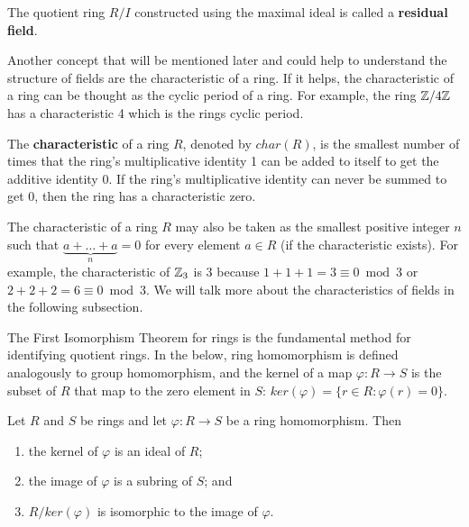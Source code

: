 \documentclass[../main.tex]{subfiles}
\begin{document}
The quotient ring $R/I$ constructed using the maximal ideal is called a \textbf{residual field}.


Another concept that will be mentioned later and could help to understand the structure of fields are the characteristic of a ring. 
If it helps, the characteristic of a ring can be thought as the cyclic period of a ring. For example, the ring $\mathbb{Z}/4\mathbb{Z}$ has a characteristic 4 which is the rings cyclic period. 

\begin{definition}
The \textbf{characteristic} of a ring $R$,\reversemarginpar{} denoted by $char(R)$, is the smallest number of times that the ring's multiplicative identity 1 can be added to itself to get the additive identity 0. If the ring's multiplicative identity can never be summed to get 0, then the ring has a characteristic zero. 
\end{definition}
The characteristic of a ring $R$ may also be taken as the smallest positive integer $n$ such that $\underbrace{a + \dots + a}_n = 0$ for every element $a \in R$ (if the characteristic exists). For example, the characteristic of $\mathbb{Z}_3$ is 3 because $1+1+1=3 \equiv 0 \bmod 3$ or $2+2+2=6 \equiv 0 \bmod 3$. We will talk more about the characteristics of fields in the following subsection. 


The First Isomorphism Theorem for rings is the fundamental method for identifying quotient rings. 
In the below, ring homomorphism is defined analogously to group homomorphism, and the kernel\reversemarginpar
{}
 of a map $\varphi : R \to S$ is the subset of $R$ that map to the zero element in $S$: $ker(\varphi) = \{ r \in R : \varphi(r) = 0 \}$.
\begin{theorem}\label{thm:first isomorphism theorem}
Let $R$ and $S$ be rings and let $\varphi: R \to S$ be a ring homomorphism. Then \reversemarginpar{}
\begin{enumerate}\itemsep1mm\parskip0mm
    \item the kernel of $\varphi$ is an ideal of $R$;
    \item the image of $\varphi$ is a subring of $S$; and
    \item $R/ker(\varphi)$ is isomorphic to the image of $\varphi$.  
\end{enumerate}
\end{theorem}
\end{document}
